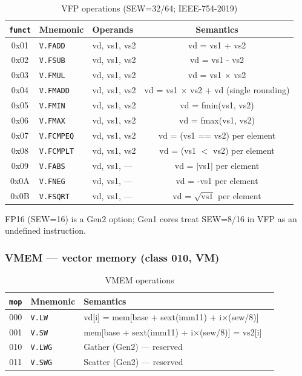 \documentclass[11pt,a4paper]{article}
\begin{document}
\begin{table}[H]
\centering
\caption{VFP operations (SEW=32/64; IEEE-754-2019)}
\begin{tabular}{cllc}
\toprule
{\tt funct} & Mnemonic & Operands & Semantics \\
\midrule
0x01 & {\tt V.FADD}  & vd, vs1, vs2 & vd = vs1 + vs2 \\
0x02 & {\tt V.FSUB}  & vd, vs1, vs2 & vd = vs1 - vs2 \\
0x03 & {\tt V.FMUL}  & vd, vs1, vs2 & vd = vs1 $\times$ vs2 \\
0x04 & {\tt V.FMADD} & vd, vs1, vs2 & vd = vs1 $\times$ vs2 + vd (single rounding) \\
0x05 & {\tt V.FMIN}  & vd, vs1, vs2 & vd = fmin(vs1, vs2) \\
0x06 & {\tt V.FMAX}  & vd, vs1, vs2 & vd = fmax(vs1, vs2) \\
0x07 & {\tt V.FCMPEQ} & vd, vs1, vs2 & vd = (vs1 == vs2) per element \\
0x08 & {\tt V.FCMPLT} & vd, vs1, vs2 & vd = (vs1 $<$ vs2) per element \\
0x09 & {\tt V.FABS}  & vd, vs1, --- & vd = $|$vs1$|$ per element \\
0x0A & {\tt V.FNEG}  & vd, vs1, --- & vd = -vs1 per element \\
0x0B & {\tt V.FSQRT} & vd, vs1, --- & vd = $\sqrt{\mathrm{vs1}}$ per element \\
\bottomrule
\end{tabular}
\end{table}

FP16 (SEW=16) is a Gen2 option; Gen1 cores treat SEW=8/16 in VFP as an
undefined instruction.

\subsubsection*{VMEM --- vector memory (class 010, VM)}

\begin{table}[H]
\centering
\caption{VMEM operations}
\begin{tabular}{clll}
\toprule
{\tt mop} & Mnemonic & Semantics \\
\midrule
000 & {\tt V.LW} & vd[i] = mem[base + sext(imm11) + i$\times$(sew/8)] \\
001 & {\tt V.SW} & mem[base + sext(imm11) + i$\times$(sew/8)] = vs2[i] \\
010 & {\tt V.LWG} & Gather (Gen2) --- reserved \\
011 & {\tt V.SWG} & Scatter (Gen2) --- reserved \\
\bottomrule
\end{tabular}
\end{table}
\end{document}
